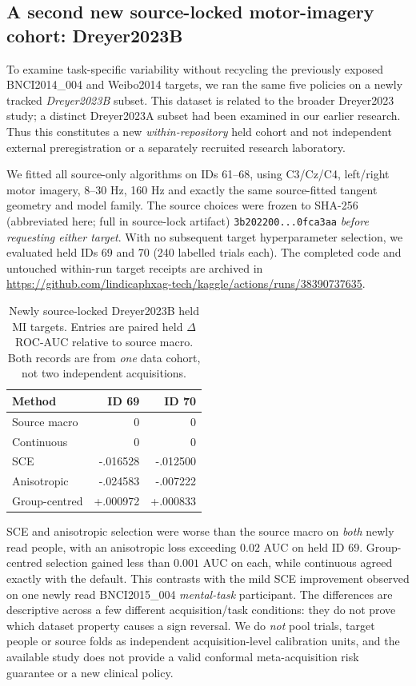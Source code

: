 \subsection{A second new source-locked motor-imagery cohort: Dreyer2023B}
\label{sec:p3-new-dreyerb}
To examine task-specific variability without recycling
the previously exposed BNCI2014\_004 and Weibo2014
targets, we ran the same five policies on a newly
tracked \emph{Dreyer2023B} subset. This dataset is
related to the broader Dreyer2023 study; a distinct
Dreyer2023A subset had been examined in our
earlier research. Thus this constitutes a
new \emph{within-repository} held cohort and
not independent external preregistration or
a separately recruited research laboratory.

We fitted all source-only algorithms on IDs
61--68, using C3/Cz/C4, left/right motor imagery,
8--30 Hz, 160 Hz and exactly the same
source-fitted tangent geometry and model family.
The source choices were frozen to SHA-256 (abbreviated here; full in source-lock artifact)
\texttt{3b202200...0fca3aa}
\emph{before requesting either target}. With
no subsequent target hyperparameter selection,
we evaluated held IDs 69 and 70 (240 labelled
trials each). The completed code and untouched
within-run target receipts are archived in
\url{https://github.com/lindicaphxag-tech/kaggle/actions/runs/38390737635}.

\begin{table}[ht]\centering\small
\caption{Newly source-locked Dreyer2023B
held MI targets. Entries are paired held
$\Delta$ROC-AUC relative to source macro.
Both records are from \emph{one} data cohort,
not two independent acquisitions.}
\label{tab:p3-dreyerb}
\begin{tabular}{lrr}
\toprule
Method & ID 69 & ID 70\\
\midrule
Source macro & 0 & 0\\
Continuous & 0 & 0\\
SCE & -.016528 & -.012500\\
Anisotropic & -.024583 & -.007222\\
Group-centred & +.000972 & +.000833\\
\bottomrule
\end{tabular}
\end{table}

SCE and anisotropic selection were worse than
the source macro on \emph{both} newly read people,
with an anisotropic loss exceeding $0.02$
AUC on held ID 69. Group-centred selection
gained less than $0.001$ AUC on each, while
continuous agreed exactly with the default.
This contrasts with the mild SCE improvement
observed on one newly read BNCI2015\_004
\emph{mental-task} participant. The
differences are descriptive across a few
different acquisition/task conditions:
they do not prove which dataset property
causes a sign reversal. We do \emph{not}
pool trials, target people or source folds
as independent acquisition-level calibration
units, and the available study does not
provide a valid conformal meta-acquisition
risk guarantee or a new clinical policy.
